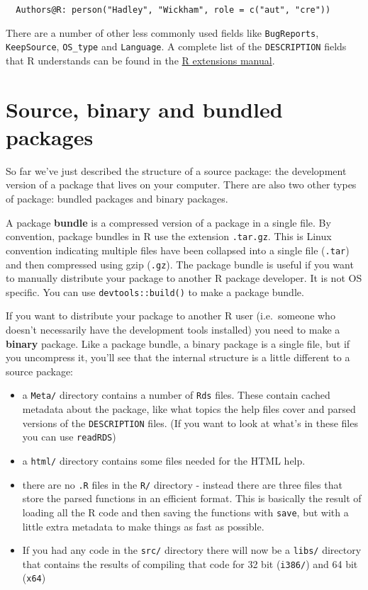 \begin{verbatim}
  Authors@R: person("Hadley", "Wickham", role = c("aut", "cre"))
\end{verbatim}

There are a number of other less commonly used fields like
\texttt{BugReports}, \texttt{KeepSource}, \texttt{OS\_type} and
\texttt{Language}. A complete list of the \texttt{DESCRIPTION} fields
that R understands can be found in the
\href{http://cran.r-project.org/doc/manuals/R-exts.html\#The-DESCRIPTION-file}{R
extensions manual}.

\section{Source, binary and bundled packages}

So far we've just described the structure of a source package: the
development version of a package that lives on your computer. There are
also two other types of package: bundled packages and binary packages.

A package \textbf{bundle} is a compressed version of a package in a
single file. By convention, package bundles in R use the extension
\texttt{.tar.gz}. This is Linux convention indicating multiple files
have been collapsed into a single file (\texttt{.tar}) and then
compressed using gzip (\texttt{.gz}). The package bundle is useful if
you want to manually distribute your package to another R package
developer. It is not OS specific. You can use \texttt{devtools::build()}
to make a package bundle.

If you want to distribute your package to another R user (i.e.~someone
who doesn't necessarily have the development tools installed) you need
to make a \textbf{binary} package. Like a package bundle, a binary
package is a single file, but if you uncompress it, you'll see that the
internal structure is a little different to a source package:

\begin{itemize}
\item
  a \texttt{Meta/} directory contains a number of \texttt{Rds} files.
  These contain cached metadata about the package, like what topics the
  help files cover and parsed versions of the \texttt{DESCRIPTION}
  files. (If you want to look at what's in these files you can use
  \texttt{readRDS})
\item
  a \texttt{html/} directory contains some files needed for the HTML
  help.
\item
  there are no \texttt{.R} files in the \texttt{R/} directory - instead
  there are three files that store the parsed functions in an efficient
  format. This is basically the result of loading all the R code and
  then saving the functions with \texttt{save}, but with a little extra
  metadata to make things as fast as possible.
\item
  If you had any code in the \texttt{src/} directory there will now be a
  \texttt{libs/} directory that contains the results of compiling that
  code for 32 bit (\texttt{i386/}) and 64 bit (\texttt{x64})
\end{itemize}

